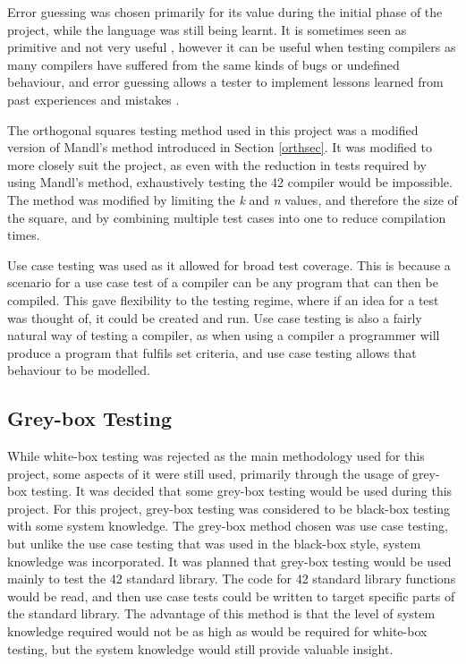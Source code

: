  Error guessing was chosen primarily for its value during the initial phase of the project, while the language was still being learnt. It is sometimes seen as primitive and not very useful \cite{enc2}, however it can be useful when testing compilers as many compilers have suffered from the same kinds of bugs or undefined behaviour, and error guessing allows a tester to implement lessons learned from past experiences and mistakes \cite{homes}. 

The orthogonal squares testing method used in this project was a modified version of Mandl's method \cite{Mandl} introduced in Section \ref{orthsec}. It was modified to more closely suit the project, as even with the reduction in tests required by using Mandl's method, exhaustively testing the 42 compiler would be impossible. The method was modified by limiting the \textit{k} and \textit{n} values, and therefore the size of the square, and by combining multiple test cases into one to reduce compilation times. 

Use case testing was used as it allowed for broad test coverage. This is because a scenario for a use case test of a compiler can be any program that can then be compiled. This gave flexibility to the testing regime, where if an idea for a test was thought of, it could be created and run. Use case testing is also a fairly natural way of testing a compiler, as when using a compiler a programmer will produce a program that fulfils set criteria, and use case testing allows that behaviour to be modelled.

\subsection{Grey-box Testing}

While white-box testing was rejected as the main methodology used for this project, some aspects of it were still used, primarily through the usage of grey-box testing. It was decided that some grey-box testing would be used during this project. For this project, grey-box testing was considered to be black-box testing with some system knowledge. The grey-box method chosen was use case testing, but unlike the use case testing that was used in the black-box style, system knowledge was incorporated. It was planned that grey-box testing would be used mainly to test the 42 standard library. The code for 42 standard library functions would be read, and then use case tests could be written to target specific parts of the standard library. The advantage of this method is that the level of system knowledge required would not be as high as would be required for white-box testing, but the system knowledge would still provide valuable insight. 

